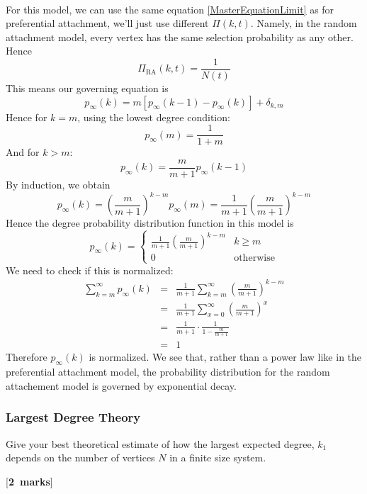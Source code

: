 \documentclass[a4paper,12pt]{article}
\newcounter{nmarks}
\newcommand{\qmarks}[1]{\addtocounter{nmarks}{#1} }
\renewcommand{\qmarks}[1]{\addtocounter{nmarks}{#1} \hspace*{\fill} [\textbf{#1~marks}]}
\begin{document}
\hfill\\
For this model, we can use the same equation \ref{MasterEquationLimit} as for preferential attachment, we'll just use different $\Pi(k,t)$. Namely, in the random attachment model, every vertex has the same selection probability as any other. Hence
$$\Pi_{\mathrm{RA}}(k,t)=\frac{1}{N(t)}$$
This means our governing equation is
\begin{equation} \label{MasterEquationLimitRA}
p_\infty(k)= m\left[ p_\infty(k-1)-p_\infty(k) \right] + \delta_{k,m}
\end{equation}
Hence for $k=m$, using the lowest degree condition:
$$p_\infty(m)=\frac{1}{1+m}$$
And for $k>m$:
$$p_\infty(k)=\frac{m}{m+1}p_\infty(k-1)$$
By induction, we obtain
$$p_\infty(k)=\left(\frac{m}{m+1}\right)^{k-m}p_\infty(m)=\frac{1}{m+1}\left(\frac{m}{m+1}\right)^{k-m}$$
Hence the degree probability distribution function in this model is
\begin{equation} \label{RAprob}
p_\infty(k)=\begin{cases}
\frac{1}{m+1}\left(\frac{m}{m+1}\right)^{k-m} & k\geq m\\
0 & \mathrm{otherwise}
\end{cases}
\end{equation}
We need to check if this is normalized:
\begin{eqnarray*}
\sum_{k=m}^\infty p_\infty(k)&=&\frac{1}{m+1} \sum_{k=m}^\infty \left(\frac{m}{m+1}\right)^{k-m}\\
&=&\frac{1}{m+1} \sum_{x=0}^\infty \left(\frac{m}{m+1}\right)^x\\
&=&\frac{1}{m+1} \cdot \frac{1}{1-\frac{m}{m+1}}\\
&=& 1
\end{eqnarray*}
Therefore $p_\infty(k)$ is normalized. We see that, rather than a power law like in the preferential attachment model, the probability distribution for the random attachement model is governed by exponential decay.

\subsubsection{Largest Degree Theory}
Give your best theoretical estimate of how the largest expected degree, $k_\mathrm{1}$ 
depends on the number of vertices $N$ in a finite size system. \qmarks{2}

\end{document}
